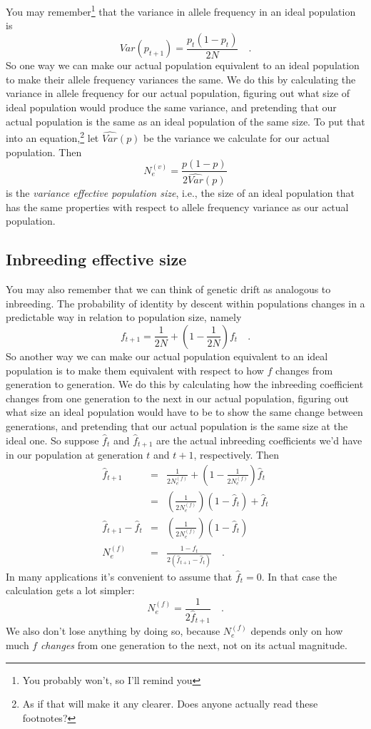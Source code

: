 You may remember\footnote{You probably won't, so I'll remind you} that
the variance in allele frequency in an ideal population is
\[
Var(p_{t+1}) = \frac{p_t(1-p_t)}{2N} \quad.
\]
So one way we can make our actual population equivalent to an ideal
population to make their allele frequency variances the same. We do
this by calculating the variance in allele frequency for our actual
population, figuring out what size of ideal population would produce
the same variance, and pretending that our actual population is the
same as an ideal population of the same size. To put that into an
equation,\footnote{As if that will make it any clearer. Does anyone
  actually read these footnotes?} let $\widehat{Var}(p)$ be the
variance we calculate for our actual population. Then
\[
N_e^{(v)} = \frac{p(1-p)}{2\widehat{Var}(p)}
\]
is the {\it variance effective population size}, i.e., the size of an
ideal population that has the same properties with respect to allele
frequency variance as our actual population.

\subsection*{Inbreeding effective size}

You may also remember that we can think of genetic drift as analogous
to inbreeding. The probability of identity by descent within
populations changes in a predictable way in relation to population
size, namely
\[
f_{t+1}
   = \frac{1}{2N} + \left(1 - \frac{1}{2N}\right)f_t \quad.
\]
So another way we can make our actual population equivalent to an
ideal population is to make them equivalent with respect to how $f$
changes from generation to generation. We do this by calculating how
the inbreeding coefficient changes from one generation to the next in
our actual population, figuring out what size an ideal population
would have to be to show the same change between generations, and
pretending that our actual population is the same size at the ideal
one. So suppose $\hat f_t$ and $\hat f_{t+1}$ are the actual
inbreeding coefficients we'd have in our population at generation $t$
and $t+1$, respectively. Then
\begin{eqnarray*}
\hat f_{t+1} &=& \frac{1}{2N_e^{(f)}} + \left(1 -
        \frac{1}{2N_e^{(f)}}\right)\hat f_t \\
        &=& \left(\frac{1}{2N_e^{(f)}}\right)(1 - \hat f_t) + \hat f_t \\
\hat f_{t+1} - \hat f_t &=& \left(\frac{1}{2N_e^{(f)}}\right)(1 - \hat
        f_t) \\
N_e^{(f)} &=& \frac{1 - \hat f_t}{2(\hat f_{t+1} - \hat f_t)} \quad .
\end{eqnarray*}
In many applications it's convenient to assume that $\hat f_t = 0$. In
that case the calculation gets a lot simpler:
\[
N_e^{(f)} = \frac{1}{2\hat f_{t+1}} \quad .
\]
We also don't lose anything by doing so, because $N_e^{(f)}$ depends
only on how much $f$ {\it changes\/} from one generation to the next,
not on its actual magnitude.

